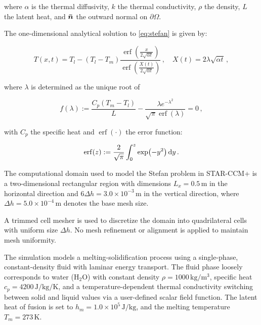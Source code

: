 where \(\alpha\) is the thermal diffusivity, \(k\) the thermal 
conductivity, \(\rho\) the density, \(L\) the latent heat, and \(\bm{\bar{n}}\) 
the outward normal on \(\partial \Omega\).

The one-dimensional analytical solution to \eqref{eq:stefan} is given by:

\begin{equation}
T(x,t) = T_l - (T_l - T_m) 
\frac{\operatorname{erf}\left(\frac{x}{2 \sqrt{\alpha t}}\right)}{\operatorname{erf}\left(\frac{X(t)}{2 \sqrt{\alpha t}}\right)}\,, \quad
X(t) = 2 \lambda \sqrt{\alpha t}\,,
\end{equation}

where \(\lambda\) is determined as the unique root of

\[
f(\lambda) := \frac{C_p (T_m - T_l)}{L} - \frac{\lambda e^{-\lambda^{2}}}{\sqrt{\pi} \operatorname{erf}(\lambda)} = 0\,,
\]

with \(C_p\) the specific heat and \(\operatorname{erf}(\cdot)\) the error function:

\[
\operatorname{erf}(z) := \frac{2}{\sqrt{\pi}} \int_0^z \exp(-y^2) \mathop{}\!\mathrm{d}{y}\,.
\]

The computational domain used to model the Stefan problem in STAR-CCM+
is a two-dimensional rectangular region with dimensions \(L_x = 0.5\,\si{\meter}\) in the 
horizontal direction and \(6 \Delta h = 3.0 \times 10^{-3}\,\si{\meter}\) in the 
vertical direction, where \(\Delta h = 5.0 \times 10^{-4}\,\si{\meter}\) denotes the base mesh size.

A trimmed cell mesher is used to discretize the domain into quadrilateral cells with 
uniform size \(\Delta h\). No mesh refinement or alignment is applied to maintain mesh uniformity.

The simulation models a melting-solidification process using a single-phase, constant-density 
fluid with laminar energy transport. The fluid phase loosely corresponds to water (\(\mathrm{H_2O}\)) with 
constant density \(\rho = 1000\,\si{\kilogram\per\meter^3}\), specific 
heat \(c_p = 4200\,\si{\joule\per\kilogram\per\kelvin}\), and a temperature-dependent 
thermal conductivity switching between solid and liquid values via a user-defined scalar field function. 
The latent heat of fusion is set to \(h_m = 1.0 \times 10^5\,\si{\joule\per\kilogram}\), and 
the melting temperature \(T_m = 273\,\si{\kelvin}\).

